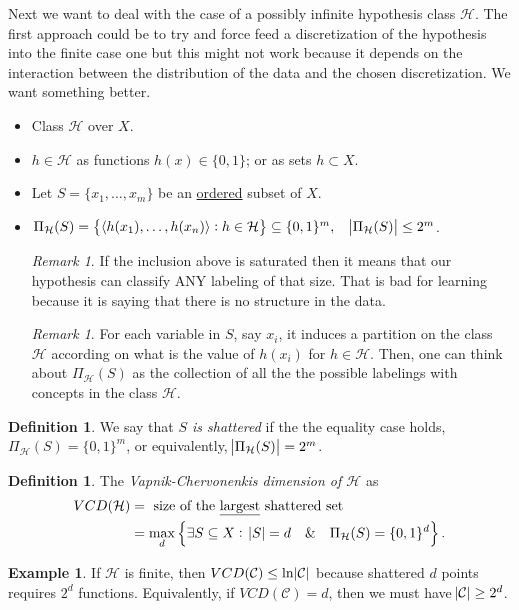 \documentclass[12pt, letterpaper]{article}
\numberwithin{equation}{section} %
\newcommand{\ul}{\underline}
\newcommand{\mc}{\mathcal}
\theoremstyle{definition}
\newtheorem{definition}[theorem]{Definition}
\newtheorem{example}[theorem]{Example}
\theoremstyle{remark}
\newtheorem{remark}[theorem]{Remark}
\begin{document}
Next we want to deal with the case of a possibly infinite hypothesis class $\mc H$. The first approach could be to try and force feed a discretization of the hypothesis into the finite case one but this might not work because it depends on the interaction between the distribution of the data and the chosen discretization. We want something better.

\begin{itemize}
    \item Class $\mc H$ over $X$.
    \item $h\in \mc H$ as functions $h(x)\in \lbrace0,1\rbrace$; or as sets $h\subset X$.
    \item Let $S=\lbrace x_1,\ldots,x_m\rbrace$ be an \ul{ordered} subset of $X$.
    \item $\Pi_{\mc H}(S) = \left\{\langle h(x_1),\ldots,h(x_n)\rangle:h\in\mc H\right\} \subseteq \lbrace0,1\rbrace^m,\quad\abs{\Pi_{\mc H}(S)}\leq 2^m$.
    \begin{remark}
        If the inclusion above is saturated then it means that our hypothesis can classify ANY labeling of that size. That is bad for learning because it is saying that there is no structure in the data.
    \end{remark}
    \begin{remark}
        For each variable in $S$, say $x_i$, it induces a partition on the class $\mc H$ according on what is the value of $h(x_i)$ for $h \in \mc H$. Then, one can think about $\Pi_{\mc H}(S)$ as the collection of all the the possible labelings with concepts in the class $\mc H$. 
    \end{remark}
\end{itemize}    
\begin{definition}
    We say that \emph{$S$ is shattered} if the the equality case holds, $\Pi_{\mc H}(S) = \lbrace 0, 1\rbrace^m$, or equivalently, $\abs{\Pi_{\mc H}(S)} = 2^m$.
\end{definition}
\begin{definition}
    The \emph{Vapnik-Chervonenkis dimension of $\mc H$} as
    \begin{align}
        VCD(\mc H) &= \textrm{ size of the \ul{largest} shattered set}\\
        &= \max\limits_d\left\{\exists S\subseteq X:\;\abs{S}=d\quad\&\quad\Pi_{\mc H}(S) = \lbrace 0,1\rbrace^d\right\}.
    \end{align}
\end{definition}

\begin{example}
    If $\mc H$ is finite, then $VCD(\mc C)\leq \ln\abs{\mc C}$ because shattered $d$ points requires $2^d$ functions. Equivalently, if $VCD(\mc C) = d$, then we must have $\abs{\mc C} \geq 2^d$.
\end{example} 
    
\end{document}
